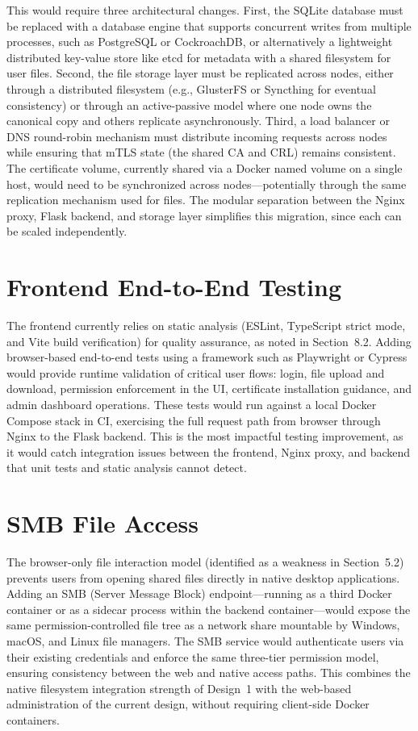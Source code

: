 \documentclass[12pt,letterpaper]{report}
\begin{document}
This would require three architectural changes. First, the SQLite database must be replaced with a database engine that supports concurrent writes from multiple processes, such as PostgreSQL or CockroachDB, or alternatively a lightweight distributed key-value store like etcd for metadata with a shared filesystem for user files. Second, the file storage layer must be replicated across nodes, either through a distributed filesystem (e.g., GlusterFS or Syncthing for eventual consistency) or through an active-passive model where one node owns the canonical copy and others replicate asynchronously. Third, a load balancer or DNS round-robin mechanism must distribute incoming requests across nodes while ensuring that mTLS state (the shared CA and CRL) remains consistent. The certificate volume, currently shared via a Docker named volume on a single host, would need to be synchronized across nodes---potentially through the same replication mechanism used for files. The modular separation between the Nginx proxy, Flask backend, and storage layer simplifies this migration, since each can be scaled independently.

\section{Frontend End-to-End Testing}

The frontend currently relies on static analysis (ESLint, TypeScript strict mode, and Vite build verification) for quality assurance, as noted in Section~8.2. Adding browser-based end-to-end tests using a framework such as Playwright or Cypress would provide runtime validation of critical user flows: login, file upload and download, permission enforcement in the UI, certificate installation guidance, and admin dashboard operations. These tests would run against a local Docker Compose stack in CI, exercising the full request path from browser through Nginx to the Flask backend. This is the most impactful testing improvement, as it would catch integration issues between the frontend, Nginx proxy, and backend that unit tests and static analysis cannot detect.

\section{SMB File Access}

The browser-only file interaction model (identified as a weakness in Section~5.2) prevents users from opening shared files directly in native desktop applications. Adding an SMB (Server Message Block) endpoint---running as a third Docker container or as a sidecar process within the backend container---would expose the same permission-controlled file tree as a network share mountable by Windows, macOS, and Linux file managers. The SMB service would authenticate users via their existing credentials and enforce the same three-tier permission model, ensuring consistency between the web and native access paths. This combines the native filesystem integration strength of Design~1 with the web-based administration of the current design, without requiring client-side Docker containers.
\end{document}
